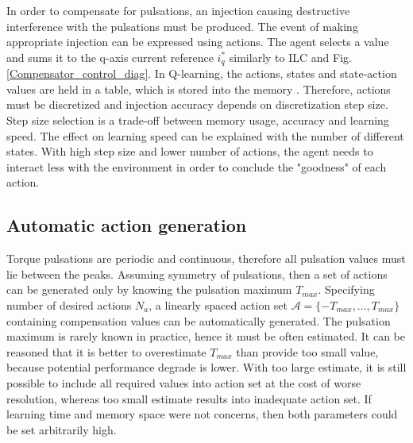In order to compensate for pulsations, an injection causing destructive interference with the pulsations must be produced. The event of making appropriate injection can be expressed using actions. The agent selects a value and sums it to the q-axis current reference $i_q^*$ similarly to ILC and Fig. \ref{Compensator_control_diag}. In Q-learning, the actions, states and state-action values are held in a table, which is stored into the memory \cite{RL:Sutton-Barto}. Therefore, actions must be discretized and injection accuracy depends on discretization step size. Step size selection is a trade-off between memory usage, accuracy and learning speed. The effect on learning speed can be explained with the number of different states. With high step size and lower number of actions, the agent needs to interact less with the environment in order to conclude the "goodness" of each action.


\subsection{Automatic action generation}
Torque pulsations are periodic and continuous, therefore all pulsation values must lie between the peaks. Assuming symmetry of pulsations, then a set of actions can be generated only by knowing the pulsation maximum $T_{max}$. Specifying number of desired actions $N_a$, a linearly spaced action set $\mathcal{A} = \{-T_{max}, ..., T_{max}\}$ containing compensation values can be automatically generated. The pulsation maximum is rarely known in practice, hence it must be often estimated. It can be reasoned that it is better to overestimate $T_{max}$ than provide too small value, because potential performance degrade is lower. With too large estimate, it is still possible to include all required values into action set at the cost of worse resolution, whereas too small estimate results into inadequate action set. If learning time and memory space were not concerns, then both parameters could be set arbitrarily high.

